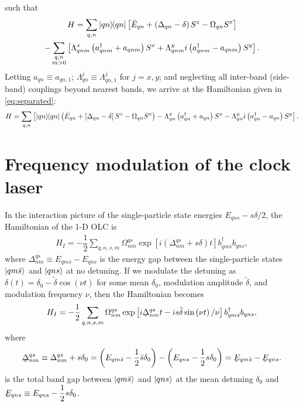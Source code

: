 \documentclass[aps,notitlepage,nofootinbib,11pt]{revtex4-1}
\newcommand{\f}[2]{\dfrac{#1}{#2}} %
\newcommand{\p}[1]{\left(#1\right)} %
\renewcommand{\sp}[1]{\left[#1\right]} %
\newcommand{\1}{\mathds{1}}
\newcommand{\utilde}[1]{\underaccent{\tilde}{#1}}
\begin{document}
such that
\begin{multline}
  H = \sum_{q,n}\op{qn}
  \sp{\bar E_{qn} + \p{\Delta_{qn}-\delta}S^z - \Omega_{qn}S^x} \\
  - \sum_{\substack{q,n\\m>0}}
  \sp{\Lambda_{qnm}^x \p{a_{qnm}^\dag + a_{qnm}}S^x
    + \Lambda_{qnm}^y i\p{a_{qnm}^\dag - a_{qnm}}S^y}.
\end{multline}
Letting $a_{qn}\equiv a_{qn,1}$;
$\Lambda_{qn}^j\equiv\Lambda_{qn,1}^j$ for $j=x,y$; and neglecting all
inter-band (side-band) couplings beyond nearest bands, we arrive at
the Hamiltonian given in \eqref{eq:separated}:
\begin{align}
  H
  = \sum_{q,n} \sp{\op{qn}
    \p{\bar E_{qn} + \sp{\Delta_{qn}-\delta}S^z - \Omega_{qn}S^x}
    - \Lambda_{qn}^x \p{a_{qn}^\dag + a_{qn}}S^x
    - \Lambda_{qn}^y i\p{a_{qn}^\dag - a_{qn}}S^y}.
\end{align}


\section{Frequency modulation of the clock laser}
\label{sec:freq_mod_derivation}

In the interaction picture of the single-particle state energies
$E_{qns}-s\delta/2$, the Hamiltonian of the 1-D OLC is
\begin{align}
  H_I
  = - \f12\sum_{q,n,s,m} \Omega^{qs}_{nm}
  \exp\sp{i\p{\Delta^{qs}_{nm}+s\delta}t} b_{qm\bar s}^\dag b_{qns},
\end{align}
where $\Delta^{qs}_{nm}\equiv E_{qm\bar s}-E_{qns}$ is the energy gap
between the single-particle states $\ket{qm\bar s}$ and $\ket{qns}$ at
no detuning. If we modulate the detuning as
$\delta\p{t}=\delta_0-\tilde\delta\cos\p{\nu t}$ for some mean
$\delta_0$, modulation amplitude $\tilde\delta$, and modulation
frequency $\nu$, then the Hamiltonian becomes
\begin{align}
  H_I
  = - \f12\sum_{q,n,s,m} \Omega^{qs}_{nm}
  \exp\sp{i\utilde\Delta^{qs}_{nm}t-is\tilde\delta\sin\p{\nu t}/\nu}
  b_{qm\bar s}^\dag b_{qns},
\end{align}
where
\begin{align}
  \utilde\Delta^{qs}_{nm}
  \equiv \Delta^{qs}_{nm} + s\delta_0
  = \p{E_{qm\bar s}-\f12\bar s\delta_0} - \p{E_{qns}-\f12s\delta_0}
  = \utilde E_{qm\bar s} - \utilde E_{qns}.
\end{align}
is the total band gap between $\ket{qm\bar s}$ and $\ket{qns}$ at the
mean detuning $\delta_0$ and
$\utilde E_{qns}\equiv E_{qns}-\f12s\delta_0$.
\end{document}
